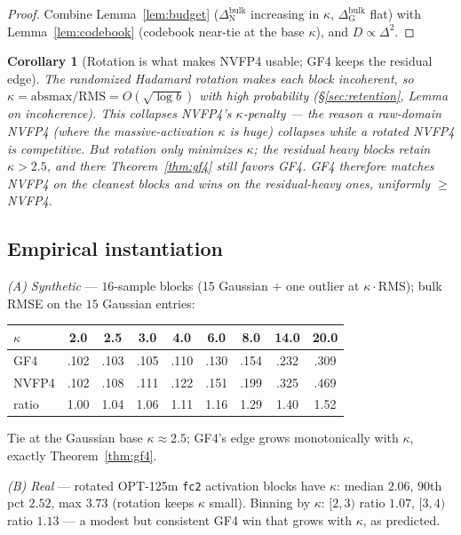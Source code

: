 \documentclass[11pt]{article}
\newtheorem{corollary}{Corollary}
\theoremstyle{remark}
\newcommand{\rms}{\mathrm{RMS}}
\newcommand{\absmax}{\mathrm{absmax}}
\begin{document}
\begin{proof}
Combine Lemma~\ref{lem:budget} ($\Delta^{\mathrm{bulk}}_{\mathrm N}$ increasing in
$\kappa$, $\Delta^{\mathrm{bulk}}_{\mathrm G}$ flat) with Lemma~\ref{lem:codebook}
(codebook near-tie at the base $\kappa$), and $D\propto\Delta^2$.
\end{proof}

\begin{corollary}[Rotation is what makes NVFP4 usable; GF4 keeps the residual edge]
\label{cor:rot}
The randomized Hadamard rotation makes each block incoherent, so
$\kappa=\absmax/\rms=O(\sqrt{\log b})$ with high probability
(\S\ref{sec:retention}, Lemma on incoherence). This collapses NVFP4's
$\kappa$-penalty --- the reason a raw-domain NVFP4 (where the massive-activation
$\kappa$ is huge) collapses while a rotated NVFP4 is competitive. But rotation
only \emph{minimizes} $\kappa$; the residual heavy blocks retain $\kappa>2.5$,
and there Theorem~\ref{thm:gf4} still favors GF4. GF4 therefore matches NVFP4 on
the cleanest blocks and wins on the residual-heavy ones, uniformly
$\ge$ NVFP4.
\end{corollary}

\subsection{Empirical instantiation}

\emph{(A) Synthetic} --- $16$-sample blocks (15 Gaussian $+$ one outlier at
$\kappa\!\cdot\!\rms$); bulk RMSE on the $15$ Gaussian entries:
\begin{center}\small
\begin{tabular}{@{}lcccccccc@{}}
\toprule
$\kappa$ & 2.0 & 2.5 & 3.0 & 4.0 & 6.0 & 8.0 & 14.0 & 20.0 \\
\midrule
GF4   & .102 & .103 & .105 & .110 & .130 & .154 & .232 & .309 \\
NVFP4 & .102 & .108 & .111 & .122 & .151 & .199 & .325 & .469 \\
ratio & 1.00 & 1.04 & 1.06 & 1.11 & 1.16 & 1.29 & 1.40 & 1.52 \\
\bottomrule
\end{tabular}
\end{center}
Tie at the Gaussian base $\kappa\!\approx\!2.5$; GF4's edge grows monotonically
with $\kappa$, exactly Theorem~\ref{thm:gf4}.

\emph{(B) Real} --- rotated OPT-125m \texttt{fc2} activation blocks have
$\kappa$: median $2.06$, $90$th pct $2.52$, max $3.73$ (rotation keeps $\kappa$
small). Binning by $\kappa$: $[2,3)$ ratio $1.07$, $[3,4)$ ratio $1.13$ --- a
modest but consistent GF4 win that grows with $\kappa$, as predicted.
\end{document}
